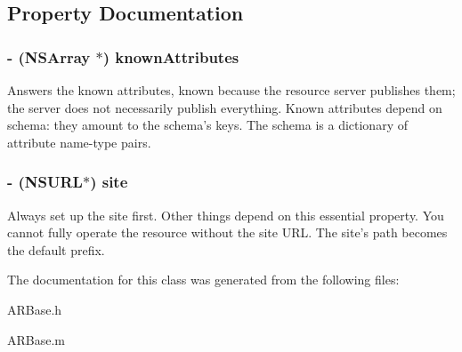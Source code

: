 \subsection{\-Property \-Documentation}
\hypertarget{interface_a_r_base_a56a8d73d2c0c3792d09a05b1f9588540}{
\subsubsection[{known\-Attributes}]{\setlength{\rightskip}{0pt plus 5cm}-\/ (\-N\-S\-Array $\ast$) known\-Attributes}}
\label{interface_a_r_base_a56a8d73d2c0c3792d09a05b1f9588540}
\-Answers the known attributes, known because the resource server publishes them; the server does not necessarily publish everything. \-Known attributes depend on schema\-: they amount to the schema's keys. \-The schema is a dictionary of attribute name-\/type pairs. \hypertarget{interface_a_r_base_a41acdb2fabc743190d933890aa6e0f33}{
\subsubsection[{site}]{\setlength{\rightskip}{0pt plus 5cm}-\/ (\-N\-S\-U\-R\-L$\ast$) site}}
\label{interface_a_r_base_a41acdb2fabc743190d933890aa6e0f33}
\-Always set up the site first. \-Other things depend on this essential property. \-You cannot fully operate the resource without the site \-U\-R\-L. \-The site's path becomes the default prefix. 

\-The documentation for this class was generated from the following files\-:\begin{DoxyCompactItemize}
\item 
\-A\-R\-Base.\-h\item 
\-A\-R\-Base.\-m\end{DoxyCompactItemize}
